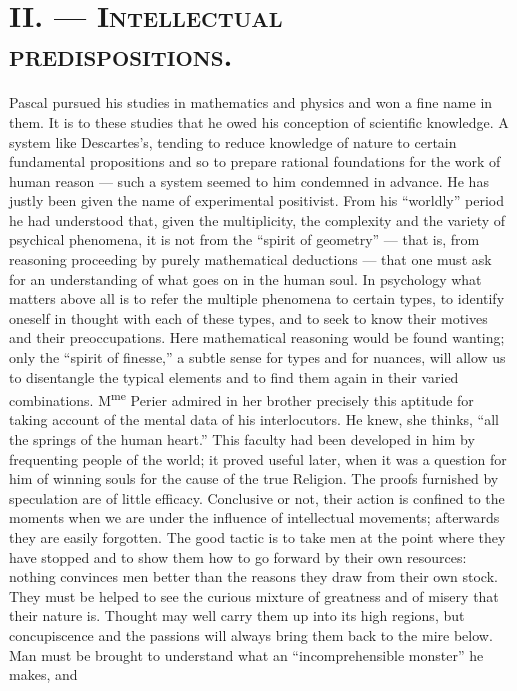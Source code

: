 \documentclass[12pt,a4paper]{article}
\newcommand{\opage}[1]{\marginnote{\footnotesize\textit{[#1]}}}
\begin{document}
\section*{II. --- \textsc{Intellectual predispositions.}}

\opage{230}Pascal pursued his studies in mathematics and physics and won a fine name in
them. It is to these studies that he owed his conception of scientific
knowledge. A system like Descartes's, tending to reduce knowledge of nature to
certain fundamental propositions and so to prepare rational foundations for the
work of human reason --- such a system seemed to him condemned in advance. He
has justly been given the name of experimental positivist. From his ``worldly''
period he had understood that, given the multiplicity, the complexity and the
variety of psychical phenomena, it is not from the ``spirit of geometry'' ---
that is, from reasoning proceeding by purely mathematical deductions --- that
one must ask for an understanding of what goes on in the human soul. In
psychology what matters above all is to refer the multiple phenomena to certain
types, to identify oneself in thought with each of these types, and to seek to
know their motives and their preoccupations. Here mathematical reasoning would
be found wanting; only the ``spirit of finesse,'' a subtle sense for types and
for nuances, will allow us to disentangle the typical elements and to find them
again in their varied combinations. M\textsuperscript{me} Perier admired in her
brother precisely this aptitude for taking account of the mental data of his
interlocutors. He knew, she thinks, ``all the springs of the human heart.'' This
faculty had been developed in him by frequenting people of the world; it proved
useful later, when it was a question for him of winning souls for the cause of
the true Religion. The proofs furnished by speculation are of little efficacy.
Conclusive or not, their action is confined to the moments when we are under
the influence of intellectual movements; afterwards they are easily forgotten.
The good tactic is to take men at the point where they have stopped and to show
them how to go forward by their own resources: nothing convinces men better
than the reasons they draw from their own stock. They must be helped to see the
curious mixture of greatness and of misery that their nature is. Thought may
well carry them up into its high regions, but concupiscence and the passions
will always bring them back to the mire below. Man must be brought to
understand what an ``incomprehensible monster'' he makes, and
\end{document}
